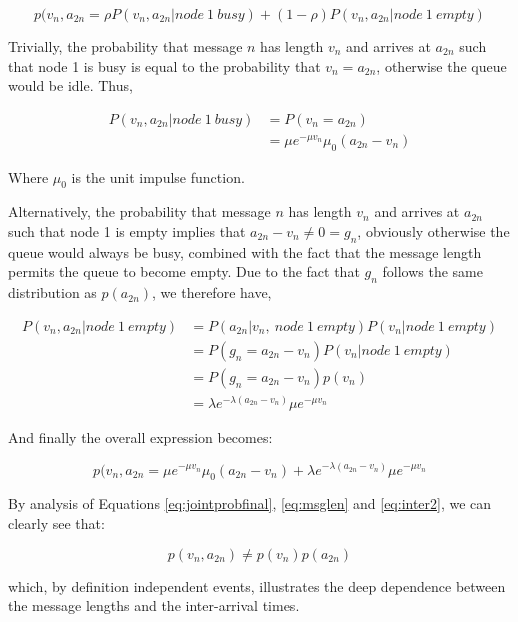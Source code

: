 \begin{equation}
 p(v_n, a_{2n} = \rho P(v_n,a_{2n}|node~ 1~ busy) + (1-\rho)P(v_n,a_{2n}|node~ 1~ empty)
\label{eq:jointprobtent}
\end{equation}

Trivially, the probability that message $n$ has length $v_n$ and arrives at $a_{2n}$ such that node 1 is busy is equal to the probability that $v_n = a_{2n}$, otherwise the queue would be idle. Thus,
 
\begin{align*}
P(v_n,a_{2n}|node~ 1~ busy) & = P(v_n = a_{2n}) \\
&= \mu e^{-\mu v_n} \mu_0(a_{2n} - v_n) 
\end{align*}

Where $\mu_0$ is the unit impulse function.

Alternatively, the probability that message $n$ has length $v_n$ and arrives at $a_{2n}$ such that node 1 is empty implies that $a_{2n} - v_n \neq 0 = g_n$, obviously otherwise the queue would always be busy, combined with the fact that the message length permits the queue to become empty. Due to the fact that $g_n$ follows the same distribution as $p(a_{2n})$, we therefore have,

\begin{align*}
P(v_n,a_{2n}|node~1~empty) & = P(a_{2n} | v_n,~ node~1~empty)P(v_n|node~1~empty)\\
& = P(g_n = a_{2n} - v_n)P(v_n|node~ 1~ empty) \\
& = P(g_n = a_{2n} - v_n)p(v_n) \\
& = \lambda e^{-\lambda(a_{2n} - v_n)}\mu e^{-\mu v_n}
\end{align*}

And finally the overall expression becomes:

\begin{equation}
 p(v_n, a_{2n} = \mu e^{-\mu v_n} \mu_0(a_{2n} - v_n) + \lambda e^{-\lambda(a_{2n} - v_n)}\mu e^{-\mu v_n}
\label{eq:jointprobfinal}
\end{equation}

By analysis of Equations \ref{eq:jointprobfinal}, \ref{eq:msglen} and \ref{eq:inter2}, we can clearly see that:

\begin{equation*}
 p(v_n, a_{2n}) \neq p(v_n)p(a_{2n})
\end{equation*}

which, by definition independent events, illustrates the deep dependence between the message lengths and the inter-arrival times. 


